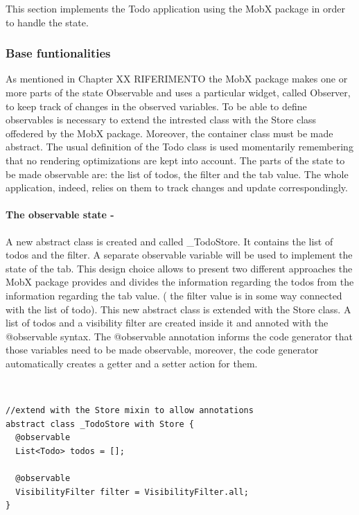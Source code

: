 This section implements the Todo application using the MobX package in order to handle the state.

\subsubsection{Base funtionalities}  \label{par:todo_app_inherited_widget_introduction} 
 
As mentioned in Chapter XX RIFERIMENTO the MobX package makes one or more parts of the state Observable and uses a particular widget, called Observer, to keep track of changes in the observed variables. To be able to define observables is necessary to extend the intrested class with the Store class offedered by the MobX package. Moreover, the container class must be made abstract. The usual definition of the Todo class is used momentarily remembering that no rendering optimizations are kept into account. The parts of the state to be made observable are: the list of todos,  the filter and the tab value. The whole application, indeed, relies on them to track changes and update correspondingly. 
\paragraph{The observable state - }
\label{subpar:todo_app_bloc_core_state}A new abstract class is created and called \_TodoStore. It contains the list of todos and the filter. A separate observable variable will be used to implement the state of the tab. This design choice allows to present two different approaches the MobX package provides and divides the information regarding the todos from the information regarding the tab value. ( the filter value is in some way connected with the list of todo). This new abstract class is extended with the Store class. A list of todos and a visibility filter are created inside it and annoted with the @observable syntax. The @observable annotation informs the code generator that those variables need to be made observable, moreover, the code generator automatically creates a getter and a setter action for them. 
\begin{code}
\mbox{}\\
 \mbox{}
		\label{code:2.14}
\begin{verbatim}
//extend with the Store mixin to allow annotations
abstract class _TodoStore with Store {
  @observable
  List<Todo> todos = [];

  @observable
  VisibilityFilter filter = VisibilityFilter.all;
}
\end{verbatim}
\mbox{}
\end{code}

